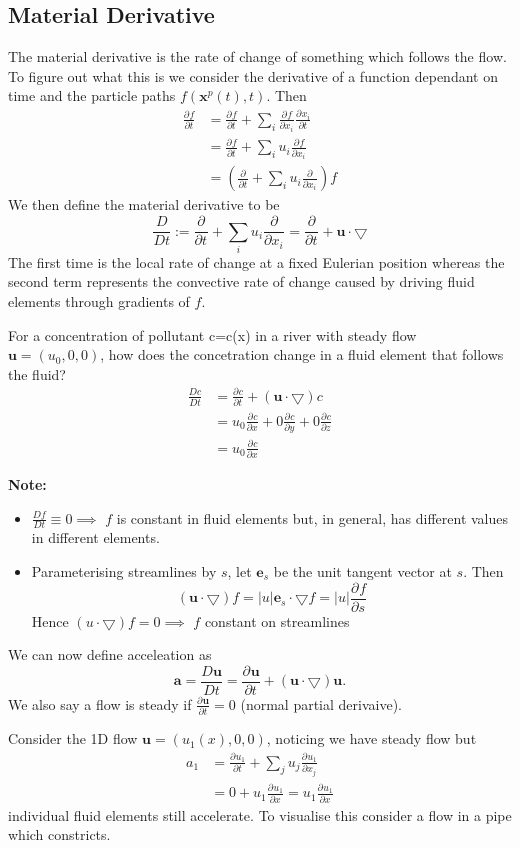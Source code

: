 \documentclass[11pt]{article}
\newcommand*{\pd}[3][]{\ensuremath{\frac{\partial^{#1} {#2}}{\partial {#3}^{#1}}}}
\newcommand*{\md}[1]{\ensuremath{\frac{D #1}{D t}}}
\newcommand{\grad}{\bigtriangledown}
\newcommand{\defeq}{:=}
\newcommand{\mv}[1]{\textbf{#1}}
\newcommand{\mdf}[1]{{\color{red}#1}}
\newenvironment{eg}
    {\begin{mdframed}[backgroundcolor=mylg, roundcorner=5pt, linewidth=0pt]}
    {\end{mdframed}}
\newenvironment{note}
    {\textbf{Note:}\begin{mdframed}[backgroundcolor=white, roundcorner=5pt, linewidth=0pt]}
    {\end{mdframed}}
\begin{document}
\subsection{Material Derivative}
The \mdf{material derivative} is the rate of change of something which follows the flow. To figure out what this is we consider the derivative of a function dependant on time and the particle paths $f(\mv{x}^p(t),t)$. Then
\begin{align*}
    \pd{f}{t}&=\pd{f}{t}+\sum_i \pd{f}{x_i}\pd{x_i}{t}\\
             &=\pd{f}{t}+\sum_i u_i\pd{f}{x_i}\\
             &=\left(\pd{ }{t} + \sum_i u_i\pd{ }{x_i}\right)f
\end{align*}
We then define the \mdf{material derivative} to be
$$\md{ }\defeq \pd{ }{t}+\sum_i u_i\pd{ }{x_i}=\pd{ }{t}+\mv{u}\cdot\grad$$
The first time is the local rate of change at a fixed Eulerian position whereas the second term represents the convective rate of change caused by driving fluid elements through gradients of $f$.
\begin{eg}
For a concentration of pollutant c=c(x) in a river with steady flow $\mv{u}=(u_0,0,0)$, how does the concetration change in a fluid element that follows the fluid?
\begin{align*}
    \md{c}&=\pd{c}{t}+(\mv{u}\cdot\grad)c\\
          &=u_0\pd{c}{x}+0\pd{c}{y}+0\pd{c}{z}\\
          &=u_0\pd{c}{x}
\end{align*}
\end{eg}
\begin{note}
\begin{itemize}
    \item $\md{f}\equiv 0 \implies$ $f$ is constant in fluid elements but, in general, has different values in different elements.
    \item Parameterising streamlines by $s$, let $\mv{e}_s$ be the unit tangent vector at $s$. Then
    $$(\mv{u}\cdot\grad) f= |u|\mv{e}_s\cdot\grad f=|u|\pd{f}{s}$$
    Hence $(u\cdot\grad)f = 0\implies$ $f$ constant on streamlines
\end{itemize}
\end{note}
We can now define \mdf{acceleation} as
$$\mv{a}=\md{\mv{u}}=\pd{\mv{u}}{t}+(\mv{u}\cdot\grad)\mv{u}.$$
We also say a flow is \mdf{steady} if $\pd{\mv{u}}{t}=0$ (normal partial derivaive).
\begin{eg}
Consider the 1D flow $\mv{u}=(u_1(x),0,0)$, noticing we have steady flow but
\begin{align*}
    a_1&=\pd{u_1}{t}+\sum_j u_j\pd{u_1}{x_j}\\
       &= 0 + u_1 \pd{u_1}{x} = u_1 \pd{u_1}{x}
\end{align*}
individual fluid elements still accelerate. To visualise this consider a flow in a pipe which constricts.
\end{eg}
\end{document}
